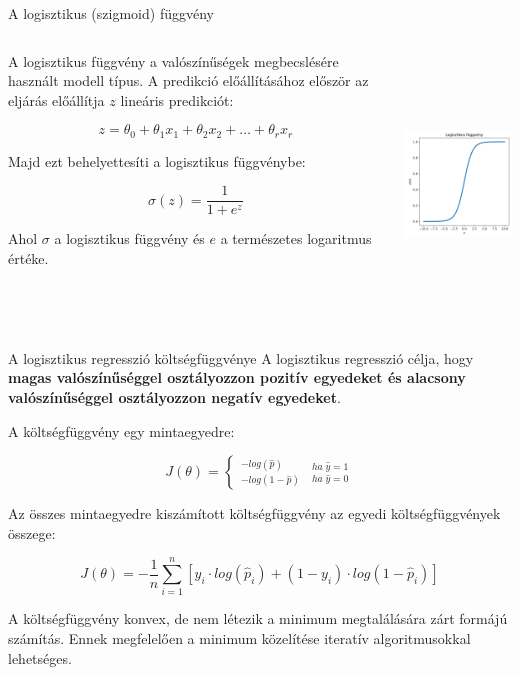 \documentclass[english, aspectratio=169]{beamer}
\begin{document}
\begin{frame}{A logisztikus (szigmoid) függvény}
\begin{columns}
\begin{column}{.5\textwidth}
A logisztikus függvény a valószínűségek megbecslésére használt modell típus. A predikció előállításához először az eljárás előállítja $z$ lineáris predikciót:
\begin{block}{}
\vspace{-.6cm}
\[
z = \theta_0 + \theta_1x_1 + \theta_2x_2 + \ldots + \theta_rx_r
\]
\end{block}
Majd ezt behelyettesíti a logisztikus függvénybe: 
\begin{block}{}
\[
\sigma\left( z \right) = \frac{1}{1 + e^z}
\]
\end{block}
Ahol $\sigma$ a logisztikus függvény és $e$ a természetes logaritmus értéke. 
\end{column}
\begin{column}{.5\textwidth}
\begin{center}
\includegraphics[width=7cm, height=7cm, keepaspectratio]{images/osztalyozas_18.png}
\end{center}
\end{column}
\end{columns}
\end{frame}

\begin{frame}{A logisztikus regresszió költségfüggvénye}
A logisztikus regresszió célja, hogy \textbf{magas valószínűséggel osztályozzon pozitív egyedeket és alacsony valószínűséggel osztályozzon negatív egyedeket}.\par\smallskip
A költségfüggvény egy mintaegyedre: 
\begin{block}{}
\[
J\left( \theta \right) = \begin{cases}
_{-log\left(1-\hat{p}\right)}^{-log\left(\hat{p}\right)} & _{ha\;\hat{y}=0}^{ha\;\hat{y}=1}\end{cases}
\]
\end{block}
Az összes mintaegyedre kiszámított költségfüggvény az egyedi költségfüggvények összege:
\begin{block}{}
\[
J\left( \theta \right) = -\frac{1}{n} \sum_{i=1}^n \left[ y_i \cdot log \left( \hat{p}_i \right) + \left(1 - y_i \right) \cdot log \left( 1 - \hat{p}_i \right) \right]
\]
\end{block}
A költségfüggvény konvex, de nem létezik a minimum megtalálására zárt formájú számítás. Ennek megfelelően a minimum közelítése iteratív algoritmusokkal lehetséges.
\end{frame}
\end{document}
